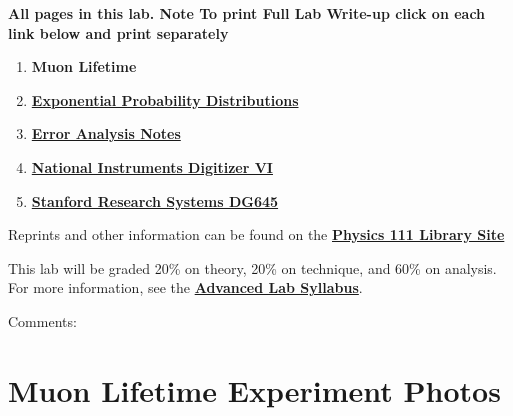 \documentclass{../lab}
\begin{document}
\noindent\textbf{All pages in this lab. Note To print Full Lab Write-up click on each link below and print separately }

\begin{enumerate}
    \item \textbf{Muon Lifetime}
    
    \item \href{http://experimentationlab.berkeley.edu/node/86}{\textbf{Exponential Probability Distributions}}
    
    \item \href{http://experimentationlab.berkeley.edu/EAX}{\textbf{Error Analysis Notes}}
    
    \item \href{http://experimentationlab.berkeley.edu/node/88}{\textbf{National Instruments Digitizer VI}}
    
    \item \href{http://experimentationlab.berkeley.edu/sites/default/files/DG645manual.pdf}{\textbf{Stanford Research Systems DG645}}
\end{enumerate}

Reprints and other information can be found on the \href{http://physics111.lib.berkeley.edu/Physics111/Reprints/MUO/MUO\_index.html}{\textbf{Physics 111 Library Site}}

This lab will be graded 20\% on theory, 20\% on technique, and 60\% on analysis. For more information, see the \href{\AdvancedLabSyllabus}{\textbf{Advanced Lab Syllabus}}.

Comments: \Feedback

\section{Muon Lifetime Experiment Photos}
\end{document}
